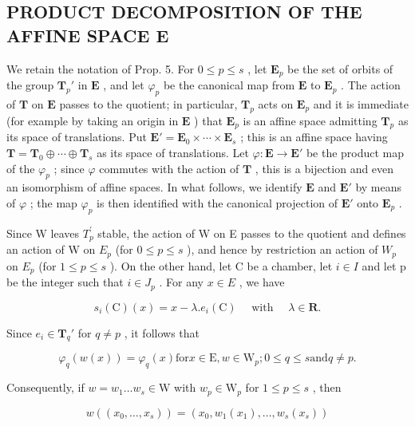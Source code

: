 \subsection{PRODUCT DECOMPOSITION OF THE AFFINE SPACE E}

We retain the notation of Prop. 5. For \(0 \leqslant p \leqslant s\) , let \(\mathbf{E}_p\) be the set of orbits of the group \(\mathbf{T}_p'\) in \(\mathbf{E}\) , and let \(\varphi_p\) be the canonical map from \(\mathbf{E}\) to \(\mathbf{E}_p\) . The action of \(\mathbf{T}\) on \(\mathbf{E}\) passes to the quotient; in particular, \(\mathbf{T}_p\) acts on \(\mathbf{E}_p\) and it is immediate (for example by taking an origin in \(\mathbf{E}\) ) that \(\mathbf{E}_p\) is an affine space admitting \(\mathbf{T}_p\) as its space of translations. Put \(\mathbf{E}' = \mathbf{E}_0 \times \cdots \times \mathbf{E}_s\) ; this is an affine space having \(\mathbf{T} = \mathbf{T}_0 \oplus \cdots \oplus \mathbf{T}_s\) as its space of translations. Let \(\varphi : \mathbf{E} \to \mathbf{E}'\) be the product map of the \(\varphi_p\) ; since \(\varphi\) commutes with the action of \(\mathbf{T}\) , this is a bijection and even an isomorphism of affine spaces. In what follows, we identify \(\mathbf{E}\) and \(\mathbf{E}'\) by means of \(\varphi\) ; the map \(\varphi_p\) is then identified with the canonical projection of \(\mathbf{E}'\) onto \(\mathbf{E}_p\) .

Since W leaves \(T_{p}^{\prime}\) stable, the action of W on E passes to the quotient and defines an action of W on \(E_{p}\) (for \(0 \leqslant p \leqslant s\) ), and hence by restriction an action of \(W_{p}\) on \(E_{p}\) (for \(1 \leqslant p \leqslant s\) ). On the other hand, let C be a chamber, let \(i \in I\) and let p be the integer such that \(i \in J_{p}\) . For any \(x \in E\) , we have

\[
s _ {i} (\mathrm{C}) (x) = x - \lambda . e _ {i} (\mathrm{C}) \quad \text { with } \quad \lambda \in \mathbf {R}.
\]

Since \(e_i \in \mathbf{T}_q'\) for \(q \neq p\) , it follows that

\[
\varphi_ {q} (w (x)) = \varphi_ {q} (x) \text {for} x \in \mathrm{E}, w \in \mathrm{W} _ {p}; 0 \leqslant q \leqslant s \text {and} q \neq p.
\]

Consequently, if \(w = w_{1} \ldots w_{s} \in \mathrm{W}\) with \(w_{p} \in \mathrm{W}_{p}\) for \(1 \leqslant p \leqslant s\) , then

\[
w \left(\left(x _ {0}, \dots , x _ {s}\right)\right) = \left(x _ {0}, w _ {1} \left(x _ {1}\right), \dots , w _ {s} \left(x _ {s}\right)\right)\tag{5}
\]

